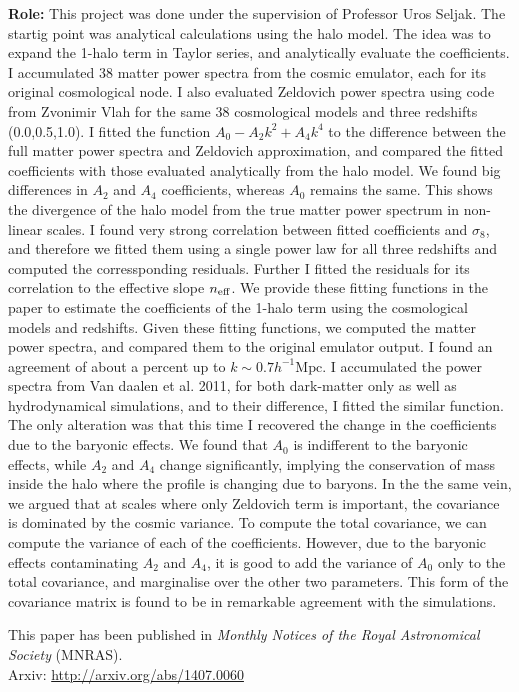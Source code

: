 {\bf Role:} This project was done under the supervision of Professor Uros Seljak. 
The startig point was analytical calculations using the halo model. The
idea was to expand the 1-halo term in Taylor series, and analytically
evaluate the coefficients. I accumulated 38 matter power spectra
from the cosmic emulator, each for its original cosmological node. I
also evaluated Zeldovich power spectra using code from Zvonimir Vlah
for the same 38 cosmological models and three redshifts (0.0,0.5,1.0).
I fitted the function $A_0 - A_2k^2 + A_4k^4$ to the difference between 
the full matter power spectra and Zeldovich
approximation, and compared
the fitted coefficients with those evaluated analytically from the halo model. 
We found big differences in $A_2$ and $A_4$ coefficients, whereas
$A_0$ remains the same. This shows the divergence of the halo model
from the true matter power spectrum in non-linear scales. 
I found very strong correlation between fitted coefficients and $\sigma_8$,
and therefore we fitted them using a single power law for all three redshifts
and computed the corressponding residuals. 
Further I fitted the residuals for its correlation to the 
effective slope $n_{\rm eff}$.
We provide these fitting functions in the paper to estimate the 
coefficients of the 1-halo term using the cosmological models
and redshifts. Given these fitting functions, we computed the matter
power spectra, and compared them to the original emulator output. 
I found an agreement of about a percent up to $k\sim 0.7 h^{-1}\mathrm{Mpc}$.
I accumulated the power spectra from Van daalen et al. 2011, for both
dark-matter only as well as hydrodynamical simulations, 
and to their difference, I fitted the similar function. 
The only alteration was that this time I 
recovered the change in the coefficients due to the baryonic effects. 
We found that $A_0$ is indifferent to the baryonic effects, while
$A_2$ and $A_4$ change significantly, implying the conservation of
mass inside the halo where the profile is changing due to baryons. 
In the the same vein, we argued that at scales where only Zeldovich
term is important, the covariance is dominated by the cosmic variance.
To compute the total covariance, we can compute the variance of 
each of the coefficients. However, due to the baryonic effects contaminating
$A_2$ and $A_4$, it is good to add the variance of $A_0$ only to the
total covariance, and marginalise over the other two parameters. 
This form of the covariance matrix is found to be in remarkable
agreement with the simulations. 

This paper has been published in {\it Monthly Notices of the Royal Astronomical
Society} (MNRAS). 
\\
Arxiv: \url{http://arxiv.org/abs/1407.0060}
\clearpage
